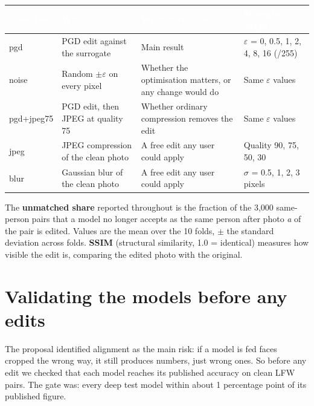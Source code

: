 \documentclass[10pt,a4paper]{article}
\begin{document}
\begin{center}\footnotesize
\begin{tabular}{>{\raggedright\arraybackslash}p{1.79cm}>{\raggedright\arraybackslash}p{4.09cm}>{\raggedright\arraybackslash}p{5.39cm}>{\raggedright\arraybackslash}p{4.59cm}}
\toprule
\rowcolor{navy}\textcolor{white}{\textbf{Condition}} & \textcolor{white}{\textbf{What it is}} & \textcolor{white}{\textbf{What it tells us}} & \textcolor{white}{\textbf{Strengths swept}} \\
\midrule
pgd & PGD edit against the surrogate & Main result & $\varepsilon$ = 0, 0.5, 1, 2, 4, 8, 16 (/255) \\
\rowcolor{zebra}noise & Random $\pm$$\varepsilon$ on every pixel & Whether the optimisation matters, or any change would do & Same $\varepsilon$ values \\
pgd+jpeg75 & PGD edit, then JPEG at quality 75 & Whether ordinary compression removes the edit & Same $\varepsilon$ values \\
\rowcolor{zebra}jpeg & JPEG compression of the clean photo & A free edit any user could apply & Quality 90, 75, 50, 30 \\
blur & Gaussian blur of the clean photo & A free edit any user could apply & $\sigma$ = 0.5, 1, 2, 3 pixels \\
\bottomrule
\end{tabular}
\end{center}

The \textbf{unmatched share} reported throughout is the fraction of the 3,000 same-person pairs that a model no longer accepts as the same person after photo \emph{a} of the pair is edited. Values are the mean over the 10 folds, $\pm$ the standard deviation across folds. \textbf{SSIM} (structural similarity, 1.0 = identical) measures how visible the edit is, comparing the edited photo with the original.


\section{Validating the models before any edits}

The proposal identified alignment as the main risk: if a model is fed faces cropped the wrong way, it still produces numbers, just wrong ones. So before any edit we checked that each model reaches its published accuracy on clean LFW pairs. The gate was: every deep test model within about 1 percentage point of its published figure.
\end{document}
